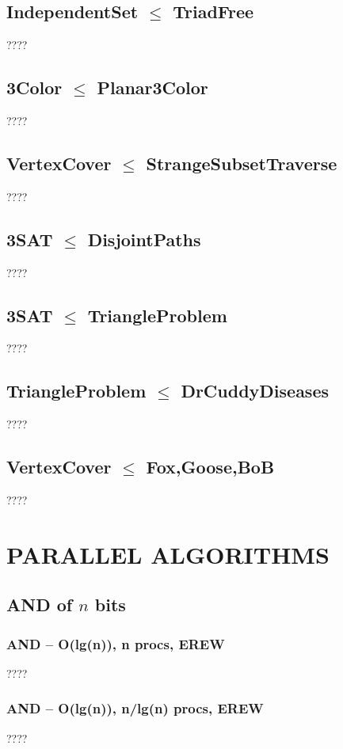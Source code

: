 \documentclass[12pt]{article}
\providecommand{\reducible}[2]{
  \textbf{#1} $\leq$ \textbf{#2}
}
\begin{document}
\subsection{\reducible{IndependentSet}{TriadFree}}
????


\subsection{\reducible{3Color}{Planar3Color}}
????


\subsection{\reducible{VertexCover}{StrangeSubsetTraverse}}
????


\subsection{\reducible{3SAT}{DisjointPaths}}
????


\subsection{\reducible{3SAT}{TriangleProblem}}
????



\subsection{\reducible{TriangleProblem}{DrCuddyDiseases}}
????


\subsection{\reducible{VertexCover}{Fox,Goose,BoB}}
????





\section{PARALLEL ALGORITHMS}
\subsection{AND of $n$ bits}
\subsubsection{AND -- O(lg(n)), n procs, EREW}
????
\subsubsection{AND -- O(lg(n)), n/lg(n) procs, EREW}
????
\end{document}
